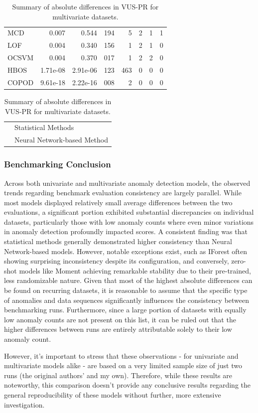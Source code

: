 \documentclass[12pt,oneside]{article}
\begin{document}
\begin{table}[htbp]
\begin{tabular}{lrrrrrrr}
        \rowcolor{lightgray} MCD & 0.007 & 0.544 & 194 & 5 & 2 & 1 & 1 \\
        \rowcolor{lightgray} LOF & 0.004 & 0.340 & 156 & 1 & 2 & 1 & 0 \\
        \rowcolor{lightgray} OCSVM & 0.004 & 0.370 & 017 & 1 & 2 & 2 & 0 \\
        \rowcolor{lightgray} HBOS & 1.71e-08 & 2.91e-06 & 123 & 463 & 0 & 0 & 0 \\
        \rowcolor{lightgray} COPOD & 9.61e-18 & 2.22e-16 & 008 & 2 & 0 & 0 & 0 \\
        \bottomrule
    \end{tabular}
    \par
    \vspace{1em}
    \noindent 
    \begin{tabular}{@{} p{1em} l @{}} 
        \rowcolor{lightgray} \strut & Statistical Methods \\
        \rowcolor{myLightBlue} \strut & Neural Network-based Method \\
    \end{tabular}
    \caption{\label{tab:Table 3} Summary of absolute differences in VUS-PR for multivariate datasets.}
\end{table}

\subsubsection{Benchmarking Conclusion}

Across both univariate and multivariate anomaly detection models, the observed trends regarding benchmark evaluation consistency are largely parallel. While most models displayed relatively small average differences between the two evaluations, a significant portion exhibited substantial discrepancies on individual datasets, particularly those with low anomaly counts where even minor variations in anomaly detection profoundly impacted scores. A consistent finding was that statistical methods generally demonstrated higher consistency than Neural Network-based models. However, notable exceptions exist, such as IForest often showing surprising inconsistency despite its configuration, and conversely, zero-shot models like Moment achieving remarkable stability due to their pre-trained, less randomizable nature. Given that most of the highest absolute differences can be found on recurring datasets, it is reasonable to assume that the specific type of anomalies and data sequences significantly influences the consistency between benchmarking runs. Furthermore, since a large portion of datasets with equally low anomaly counts are not present on this list, it can be ruled out that the higher differences between runs are entirely attributable solely to their low anomaly count. \par
However, it's important to stress that these observations - for univariate and multivariate models alike - are based on a very limited sample size of just two runs (the original authors' and my own). Therefore, while these results are noteworthy, this comparison doesn't provide any conclusive results regarding the general reproducibility of these models without further, more extensive investigation.
\end{document}
